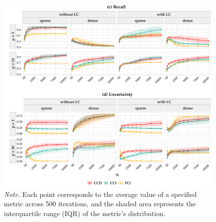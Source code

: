 \documentclass[twoside, 11pt]{article}
\begin{document}
\begin{appendices}
\begin{figure}[!htb] \ContinuedFloat
    \centering
        \includegraphics[width=1\textwidth]{figures/varyingalpha_result2.pdf}
        \caption*{\small{\textit{Note.} Each point corresponds to the average value of a specified metric across 500 iterations, and the shaded area represents the interquartile range (IQR) of the metric's distribution.}}
\end{figure}

\newpage
\vspace*{-1.5cm}

\end{appendices}
\end{document}
